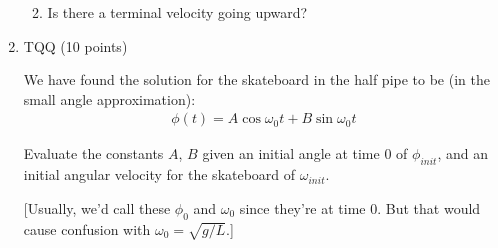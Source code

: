 \documentclass[12pt]{article}
\begin{document}
\begin{enumerate}
\begin{enumerate}

          \item Is there a terminal velocity going upward?


        \end{enumerate}

  \item TQQ (10 points)

        We have found the solution for the skateboard in the half pipe to be (in the small angle approximation):
        \begin{align}
          \phi(t) = A \cos \omega_0 t + B \sin \omega_0 t
        \end{align}

        Evaluate the constants $A$, $B$ given an initial angle at time 0 of $\phi_{init}$, and an initial angular velocity for the skateboard of $\omega_{init}$.

          [Usually, we'd call these $\phi_0$ and $\omega_0$ since they're at time 0. But that would cause confusion with $\omega_0 = \sqrt{g/L}$.]

\end{enumerate}
\end{document}
